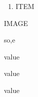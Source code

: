\documentclass{article}
\begin{document}
\noindent\begin{minipage}[t]{0.5\linewidth}
\begin{enumerate}
    \item ITEM
\end{enumerate}
\end{minipage}\hfill
\begin{minipage}[t]{0.5\linewidth}
IMAGE
\end{minipage}
so,e

\begin{enumext*}
    \item value
    \item value
    \item value
\end{enumext*}
\end{document}
